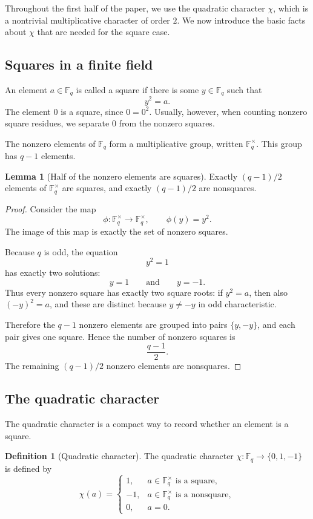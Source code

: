 \documentclass{article}
\newcommand{\F}{\mathbb F}
\theoremstyle{definition}
\newtheorem{lemma}{Lemma}
\newtheorem*{definition}{Definition}
\numberwithin{equation}{section}
\begin{document}
Throughout the first half of the paper, we use the quadratic character \(\chi\), which is a nontrivial multiplicative character of order \(2\). We now introduce the basic facts about \(\chi\) that are needed for the square case.

\subsection{Squares in a finite field}

An element \(a\in \F_q\) is called a square if there is some \(y\in \F_q\) such that
\[
y^2=a.
\]
The element \(0\) is a square, since \(0=0^2\). Usually, however, when counting nonzero square residues, we separate \(0\) from the nonzero squares.

The nonzero elements of \(\F_q\) form a multiplicative group, written \(\F_q^\times\). This group has \(q-1\) elements.

\begin{lemma}[Half of the nonzero elements are squares]
Exactly \((q-1)/2\) elements of \(\F_q^\times\) are squares, and exactly \((q-1)/2\) are nonsquares.
\end{lemma}

\begin{proof}
Consider the map
\[
\phi:\F_q^\times\to \F_q^\times,
\qquad
\phi(y)=y^2.
\]
The image of this map is exactly the set of nonzero squares.

Because \(q\) is odd, the equation
\[
y^2=1
\]
has exactly two solutions:
\[
y=1
\qquad\text{and}\qquad
 y=-1.
\]
Thus every nonzero square has exactly two square roots: if \(y^2=a\), then also \((-y)^2=a\), and these are distinct because \(y\neq -y\) in odd characteristic.

Therefore the \(q-1\) nonzero elements are grouped into pairs \(\{y,-y\}\), and each pair gives one square. Hence the number of nonzero squares is
\[
\frac{q-1}{2}.
\]
The remaining \((q-1)/2\) nonzero elements are nonsquares.
\end{proof}

\subsection{The quadratic character}

The quadratic character is a compact way to record whether an element is a square.

\begin{definition}[Quadratic character]
The quadratic character \(\chi:\F_q\to\{0,1,-1\}\) is defined by
\[
\chi(a)=
\begin{cases}
1, & a\in \F_q^\times\text{ is a square},\\
-1, & a\in \F_q^\times\text{ is a nonsquare},\\
0, & a=0.
\end{cases}
\]
\end{definition}
\end{document}
